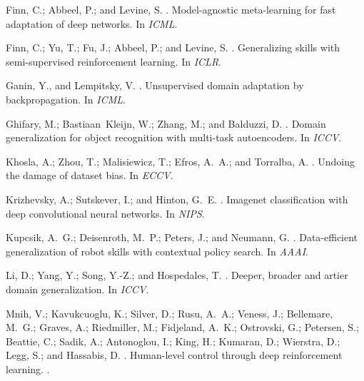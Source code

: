 \documentclass[letterpaper]{article} \usepackage{aaai18}  \usepackage{times}  \usepackage{helvet}  \usepackage{courier}  \usepackage{url}  \usepackage{graphicx}  \usepackage{amsmath}
\begin{document}
{{\begin{thebibliography}{}
Finn, C.; Abbeel, P.; and Levine, S.
.
\newblock Model-agnostic meta-learning for fast adaptation of deep networks.
\newblock In {\em ICML}.

Finn, C.; Yu, T.; Fu, J.; Abbeel, P.; and Levine, S.
.
\newblock Generalizing skills with semi-supervised reinforcement learning.
\newblock In {\em ICLR}.

Ganin, Y., and Lempitsky, V.
.
\newblock Unsupervised domain adaptation by backpropagation.
\newblock In {\em ICML}.

Ghifary, M.; Bastiaan~Kleijn, W.; Zhang, M.; and Balduzzi, D.
.
\newblock Domain generalization for object recognition with multi-task
  autoencoders.
\newblock In {\em ICCV}.

Khosla, A.; Zhou, T.; Malisiewicz, T.; Efros, A.~A.; and Torralba, A.
.
\newblock Undoing the damage of dataset bias.
\newblock In {\em ECCV}.

Krizhevsky, A.; Sutskever, I.; and Hinton, G.~E.
.
\newblock Imagenet classification with deep convolutional neural networks.
\newblock In {\em NIPS}.

Kupcsik, A.~G.; Deisenroth, M.~P.; Peters, J.; and Neumann, G.
.
\newblock Data-efficient generalization of robot skills with contextual policy
  search.
\newblock In {\em AAAI}.

Li, D.; Yang, Y.; Song, Y.-Z.; and Hospedales, T.
.
\newblock Deeper, broader and artier domain generalization.
\newblock In {\em ICCV}.

Mnih, V.; Kavukcuoglu, K.; Silver, D.; Rusu, A.~A.; Veness, J.; Bellemare,
  M.~G.; Graves, A.; Riedmiller, M.; Fidjeland, A.~K.; Ostrovski, G.; Petersen,
  S.; Beattie, C.; Sadik, A.; Antonoglou, I.; King, H.; Kumaran, D.; Wierstra,
  D.; Legg, S.; and Hassabis, D.
.
\newblock Human-level control through deep reinforcement learning.
.


\end{thebibliography}}}
\end{document}
